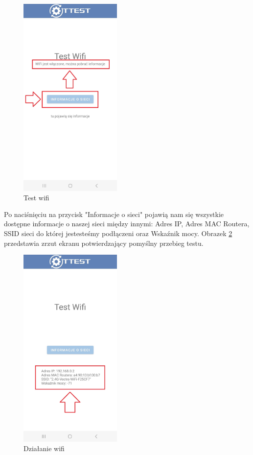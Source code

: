 \begin{figure}[!hbt]
	\begin{center}
		\includegraphics[angle=360, width=0.45\textwidth]{rys/punkt6/wifi2}
		\caption{Test wifi}
		\label{rys:wifi2}
	\end{center}
\end{figure}

\newpage


Po naciśnięciu na przycisk "Informacje o sieci" pojawią nam się wszystkie dostępne informacje o naszej sieci między innymi: Adres IP, Adres MAC Routera, SSID sieci do której jestesteśmy podłączeni oraz Wskaźnik mocy. Obrazek \ref{rys:wifi3} przedstawia zrzut ekranu potwierdzający pomyślny przebieg testu.

\begin{figure}[!hbt]
	\begin{center}
		\includegraphics[angle=360, width=0.45\textwidth]{rys/punkt6/wifi3}
		\caption{Działanie wifi}
		\label{rys:wifi3}
	\end{center}
\end{figure}

